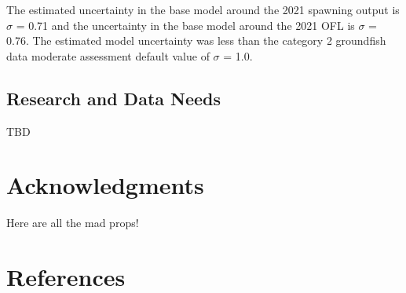 \documentclass[11pt,
  english,
  a4paper,
]{article}
\begin{document}

The estimated uncertainty in the base model around the 2021 spawning output is {\(\sigma\)\leavevmode\tagmcend\tagstructend} = 0.71 and the uncertainty in the base model around the 2021 OFL is {\(\sigma\)\leavevmode\tagmcend\tagstructend} = 0.76. The estimated model uncertainty was less than the category 2 groundfish data moderate assessment default value of {\(\sigma\)\leavevmode\tagmcend\tagstructend} = 1.0.

\leavevmode\tagmcend\tagstructend\par


\hypertarget{research-and-data-needs-1}{%
\subsection{Research and Data Needs}\label{research-and-data-needs-1}}

\leavevmode\tagmcend\tagstructend


TBD

\leavevmode\tagmcend\tagstructend\par


\hypertarget{acknowledgments}{%
\section{Acknowledgments}\label{acknowledgments}}

\leavevmode\tagmcend\tagstructend


Here are all the mad props!

\leavevmode\tagmcend\tagstructend\par

\clearpage


\hypertarget{references}{%
\section{References}\label{references}}
\end{document}
